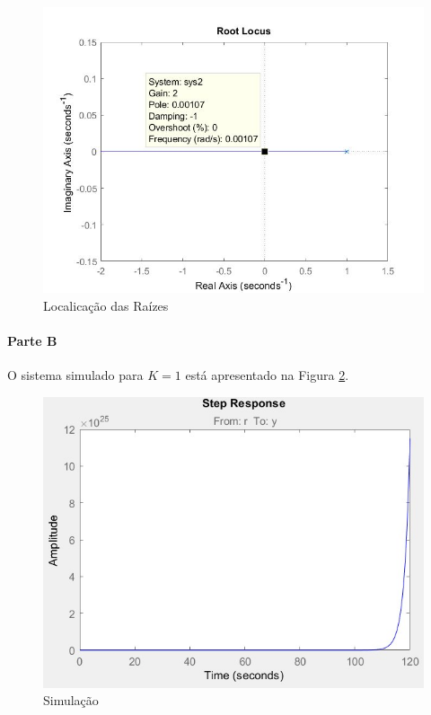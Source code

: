 \documentclass[
]{book}
\theoremstyle{definition}
\theoremstyle{definition}
\theoremstyle{definition}
\theoremstyle{remark}
\begin{document}
\begin{figure}

{\centering \includegraphics{Imagens/Lab8/Resolução/fig4} 

}

\caption{Localicação das Raízes}\label{fig:fig8R4}
\end{figure}

\hypertarget{parte-b-10}{%
\paragraph{Parte B}\label{parte-b-10}}

O sistema simulado para \(K = 1\) está apresentado na Figura \ref{fig:fig82b1}.

\begin{figure}

{\centering \includegraphics{Imagens/Lab8/Resolução/fig2b1} 

}

\caption{Simulação}\label{fig:fig82b1}
\end{figure}
\end{document}
